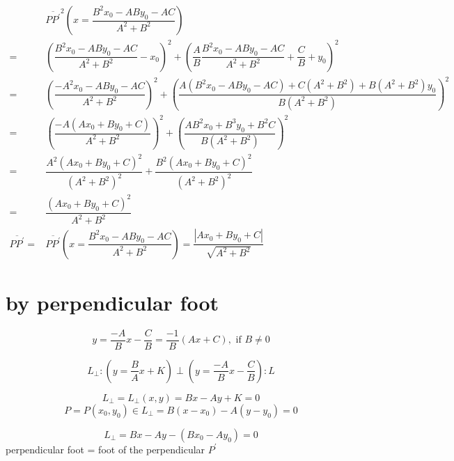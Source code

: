 \documentclass[
]{book}
\theoremstyle{definition}
\theoremstyle{definition}
\theoremstyle{definition}
\theoremstyle{definition}
\theoremstyle{remark}
\begin{document}
\[
\begin{aligned}
 & \overline{PP^{\prime}}^{2}\left(x=\dfrac{B^{2}x_{0}-ABy_{0}-AC}{A^{2}+B^{2}}\right)\\
= & \left(\dfrac{B^{2}x_{0}-ABy_{0}-AC}{A^{2}+B^{2}}-x_{0}\right)^{2}+\left(\dfrac{A}{B}\dfrac{B^{2}x_{0}-ABy_{0}-AC}{A^{2}+B^{2}}+\dfrac{C}{B}+y_{0}\right)^{2}\\
= & \left(\dfrac{-A^{2}x_{0}-ABy_{0}-AC}{A^{2}+B^{2}}\right)^{2}+\left(\dfrac{A\left(B^{2}x_{0}-ABy_{0}-AC\right)+C\left(A^{2}+B^{2}\right)+B\left(A^{2}+B^{2}\right)y_{0}}{B\left(A^{2}+B^{2}\right)}\right)^{2}\\
= & \left(\dfrac{-A\left(Ax_{0}+By_{0}+C\right)}{A^{2}+B^{2}}\right)^{2}+\left(\dfrac{AB^{2}x_{0}+B^{3}y_{0}+B^{2}C}{B\left(A^{2}+B^{2}\right)}\right)^{2}\\
= & \dfrac{A^{2}\left(Ax_{0}+By_{0}+C\right)^{2}}{\left(A^{2}+B^{2}\right)^{2}}+\dfrac{B^{2}\left(Ax_{0}+By_{0}+C\right)^{2}}{\left(A^{2}+B^{2}\right)^{2}}\\
= & \dfrac{\left(Ax_{0}+By_{0}+C\right)^{2}}{A^{2}+B^{2}}\\
\overline{PP^{\prime}}= & \overline{PP^{\prime}}\left(x=\dfrac{B^{2}x_{0}-ABy_{0}-AC}{A^{2}+B^{2}}\right)=\dfrac{\left|Ax_{0}+By_{0}+C\right|}{\sqrt{A^{2}+B^{2}}}
\end{aligned}
\]

\hypertarget{by-perpendicular-foot}{%
\section{by perpendicular foot}\label{by-perpendicular-foot}}

\[
y=\dfrac{-A}{B}x-\dfrac{C}{B}=\dfrac{-1}{B}\left(Ax+C\right),\text{ if }B\ne0
\]

\[
L_{\perp}:\left(y=\dfrac{B}{A}x+K\right)\perp\left(y=\dfrac{-A}{B}x-\dfrac{C}{B}\right):L
\]

\[
L_{\perp}=L_{\perp}\left(x,y\right)=Bx-Ay+K=0
\]
\[
P=P\left(x_{0},y_{0}\right)\in L_{\perp}=B\left(x-x_{0}\right)-A\left(y-y_{0}\right)=0
\]

\[
L_{\perp}=Bx-Ay-\left(Bx_{0}-Ay_{0}\right)=0
\]
perpendicular foot = foot of the perpendicular \(P^{\prime}\)
\end{document}
